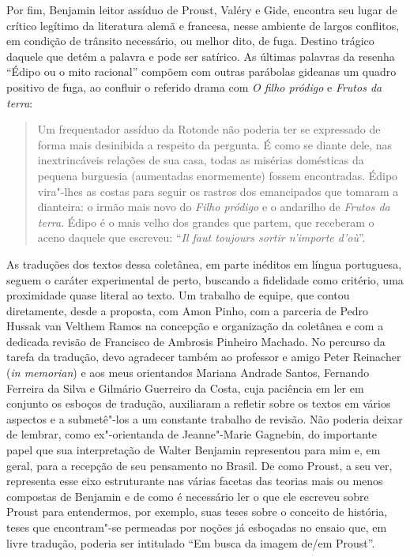Por fim, Benjamin leitor assíduo de Proust, Valéry e Gide, encontra seu
lugar de crítico legítimo da literatura alemã e francesa, nesse ambiente
de largos conflitos, em condição de trânsito necessário, ou melhor dito,
de fuga. Destino trágico daquele que detém a palavra e pode ser
satírico. As últimas palavras da resenha ``Édipo ou o mito racional''
compõem com outras parábolas gideanas um quadro positivo de fuga, ao
confluir o referido drama com \emph{O filho pródigo} e \emph{Frutos da
terra}:

\begin{quote}
Um frequentador
assíduo da Rotonde não
poderia ter se expressado de forma mais desinibida a respeito da
pergunta. É como se diante dele, nas inextrincáveis relações de sua
casa, todas as misérias domésticas da pequena burguesia (aumentadas
enormemente) fossem encontradas. Édipo vira"-lhes as costas para seguir
os rastros dos emancipados que tomaram a dianteira: o irmão mais novo do
\emph{Filho pródigo} e o andarilho de \emph{Frutos da terra}. Édipo é o
mais velho dos grandes que partem, que receberam o aceno daquele que
escreveu: ``\emph{Il faut toujours sortir n'importe d'où}''.
\end{quote}

\asterisc

As traduções dos textos dessa coletânea, em parte inéditos em língua
portuguesa, seguem o caráter experimental de perto, buscando a fidelidade
como critério, uma proximidade quase literal ao texto. Um trabalho de
equipe, que contou diretamente, desde a proposta, com Amon Pinho, com a
parceria de Pedro Hussak van Velthem Ramos na concepção e organização da coletânea e com a
dedicada revisão de Francisco de Ambrosis Pinheiro Machado. No percurso
da tarefa da tradução, devo agradecer também ao professor e amigo Peter
Reinacher (\emph{in memorian}) e aos meus orientandos Mariana Andrade Santos, Fernando
Ferreira da Silva e Gilmário Guerreiro da Costa, cuja paciência em ler
em conjunto os esboços de tradução, auxiliaram a refletir sobre os
textos em vários aspectos e a submetê"-los a um constante trabalho de
revisão. Não poderia deixar de lembrar, como ex"-orientanda de Jeanne"-Marie Gagnebin, do importante papel que sua interpretação de Walter Benjamin representou para mim e, em geral, para a recepção de seu pensamento no Brasil. De como Proust, a seu ver, representa esse eixo estruturante nas várias facetas das teorias mais ou menos compostas de Benjamin e de como é necessário ler o que ele escreveu sobre Proust para entendermos, por exemplo, suas teses sobre o conceito de história, teses que encontram"-se permeadas por noções já esboçadas no ensaio que, em livre tradução, poderia ser intitulado ``Em busca da imagem de/em Proust''. 
